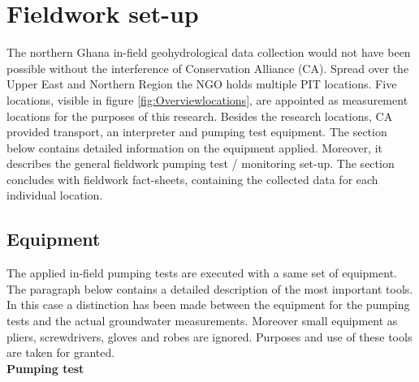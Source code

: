 \chapter{Fieldwork set-up}
\label{chapter:fieldwork_set-up}

The northern Ghana in-field geohydrological data collection would not have been possible without the interference of Conservation Alliance (CA). Spread over the Upper East and Northern Region the NGO holds multiple PIT locations. Five locations, visible in figure \ref{fig:Overviewlocations}, are appointed as measurement locations for the purposes of this research.
Besides the research locations, CA provided transport, an interpreter and pumping test equipment. The section below contains detailed information on the equipment applied. Moreover, it describes the general fieldwork pumping test / monitoring set-up. The section concludes with fieldwork fact-sheets, containing the collected data for each individual location. 

\section{Equipment}
The applied in-field pumping tests are executed with a same set of equipment. The paragraph below contains a detailed description of the most important tools. In this case a distinction has been made between the equipment for the pumping tests and the actual groundwater measurements. Moreover small equipment as pliers, screwdrivers, gloves and robes are ignored. Purposes and use of these tools are taken for granted. \\

\textbf{Pumping test} 

